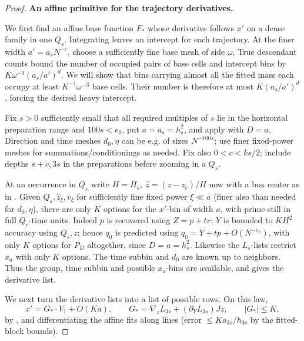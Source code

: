 \begin{proof}
\par\smallskip\noindent\textbf{An affine primitive for the trajectory derivatives.}\quad

We first find an affine base function \(F_*\) whose derivative
follows \(x'\) on a dense family in one \(Q_s\). Integrating
leaves an intercept for each trajectory. At the finer width
\(a'=a_sN^{-c}\), choose a sufficiently fine base mesh of side
\(\omega\). True descendant counts bound the number of occupied
pairs of base cells and intercept bins by
\(K\omega^{-3}(a_s/a')^d\). We will show that bins carrying
almost all the fitted mass each occupy at least
\(K^{-1}\omega^{-3}\) base cells. Their number is therefore at
most \(K(a_s/a')^d\), forcing the desired heavy intercept.


Fix \(s>0\) sufficiently small that all required multiples of \(s\) lie in the horizontal preparation range and \(100s<e_0\), put \(a=a_s=h_s^2\), and apply  with \(D=a\). Direction and time meshes \(d_0,\eta\) can be e.g. of sizes \(N^{-100s}\); use finer fixed-power meshes for summations/conditionings as needed. Fix also \(0<c<ks/2\); include depths \(s+c,3s\) in the preparations before zooming in a \(Q_s\).

At an occurrence in \(Q_s\) write \(H=H_s,\ \widehat z=(z-z_c)/H\) now with a box center as in . Given \(Q_s,\widehat z_\xi,v_\xi\) for sufficiently fine fixed power \(\xi\ll a\) (finer also than needed for \(d_0,\eta\)), there are only \(K\) options for the \(x'\)-bin of width \(a\), with prime still in full \(Q_r\)-time units. Indeed \(p\) is recovered using \(Z=p+t v\); \(Y\) is bounded to \(K H^2\) accuracy using \(Q_s,z\); hence \(q_0\) is predicted using \(q_0=Y+t p+O(N^{-e_0})\), with only \(K\) options for \(P_D\) altogether, since \(D=a=h_s^2\). Likewise the \(L_s\)-lists restrict \(x_{a}\) with only \(K\) options. The time subbin and \(d_0\) are known up to neighbors. Thus the
group, time subbin and possible \(x_a\)-bins are available, and
 gives the derivative list.

We next turn the derivative lists into a list of possible rows.
On this law,
\[
 x'=G_*\cdot V_1+O(K a),\qquad G_*=\nabla_z L_{3s}+(\partial_Y L_{3s})Jz,\qquad |G_*|\le K ,
\]
by , and differentiating the affine fits along lines (error \(\le K a_{3s}/h_{3s}\) by the fitted-block bounds).


\end{proof}
